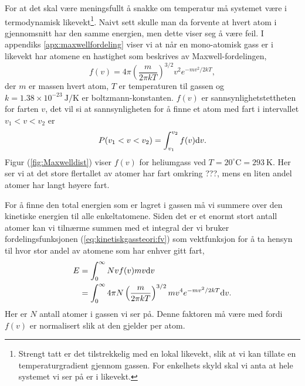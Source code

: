 For at det skal være meningsfullt å snakke om temperatur må systemet være i termodynamisk likevekt\footnote{Strengt tatt er det tilstrekkelig med en lokal likevekt, slik at vi kan tillate en temperaturgradient gjennom gassen. For enkelhets skyld skal vi anta at hele systemet vi ser på er i likevekt.}. Naivt sett skulle man da forvente at hvert atom i gjennomsnitt har den samme energien, men dette viser seg å være feil. I appendiks \ref{apx:maxwellfordeling} viser vi at når en mono-atomisk gass er i likevekt har atomene en hastighet som beskrives av Maxwell-fordelingen,
\begin{equation}
\label{eq:kinetiskgassteori:fv}	
	f(v) = 4\pi\left( \frac{m}{2\pi kT} \right)^{3/2} v^2e^{-mv^2/2kT},
\end{equation}
der $m$ er massen hvert atom, $T$ er temperaturen til gassen og $k = 1.38\times10^{-23}~\mathrm{J/K}$ er boltzmann-konstanten. $f(v)$ er sannsynlighetstettheten for farten $v$, det vil si at sannsynligheten for å finne et atom med fart i intervallet $v_1<v<v_2$ er
\begin{displaymath}
	P(v_1 < v < v_2) = \int_{v_1}^{v_2} f(v) \text{d} v.
\end{displaymath}
Figur (\ref{fig:Maxwelldist}) viser $f(v)$ for heliumgass ved $T=20^\circ\mathrm{C} = 293~\mathrm{K}$. Her ser vi at det store flertallet av atomer har fart omkring ???, mens en liten andel atomer har langt høyere fart. 

For å finne den total energien som er lagret i gassen må vi summere over den kinetiske energien til alle enkeltatomene. Siden det er et enormt stort antall atomer kan vi tilnærme summen med et integral der vi bruker fordelingsfunksjonen (\ref{eq:kinetiskgassteori:fv}) som vektfunksjon for å ta hensyn til hvor stor andel av atomene som har enhver gitt fart,
\begin{displaymath}
\begin{aligned}
	E &= \int_0^\infty N vf(v)mv\text{d} v \\
	&= \int_0^\infty 4\pi N\left(\frac{m}{2\pi kT}\right)^{3/2} mv^4 e^{-mv^2/2kT} \text{d} v.
\end{aligned}
\end{displaymath}
Her er $N$ antall atomer i gassen vi ser på. Denne faktoren må være med fordi $f(v)$ er normalisert slik at den gjelder per atom.

